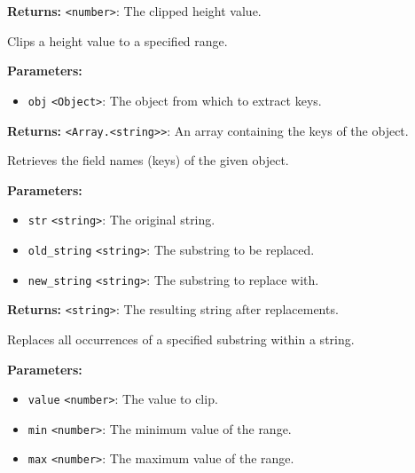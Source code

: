 \documentclass[12pt,a4paper]{article}
\begin{document}
\noindent \textbf{Returns:} \texttt{<number>}: The clipped height value.

\noindent Clips a height value to a specified range.

\vspace{5mm}
\noindent {}


\noindent \textbf{Parameters:}
\begin{itemize}
  \item \texttt{obj} \texttt{<Object>}: The object from which to extract keys.
\end{itemize}

\noindent \textbf{Returns:} \texttt{<Array.<string>>}: An array containing the keys of the object.

\noindent Retrieves the field names (keys) of the given object.

\vspace{5mm}
\noindent {}


\noindent \textbf{Parameters:}
\begin{itemize}
  \item \texttt{str} \texttt{<string>}: The original string.
  \item \texttt{old\_string} \texttt{<string>}: The substring to be replaced.
  \item \texttt{new\_string} \texttt{<string>}: The substring to replace with.
\end{itemize}

\noindent \textbf{Returns:} \texttt{<string>}: The resulting string after replacements.

\noindent Replaces all occurrences of a specified substring within a string.

\vspace{5mm}
\noindent {}


\noindent \textbf{Parameters:}
\begin{itemize}
  \item \texttt{value} \texttt{<number>}: The value to clip.
  \item \texttt{min} \texttt{<number>}: The minimum value of the range.
  \item \texttt{max} \texttt{<number>}: The maximum value of the range.
\end{itemize}
\end{document}
